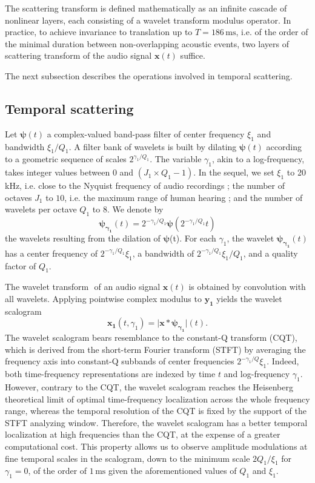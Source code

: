 \documentclass[journal]{IEEEtran}
\makeatletter
\newcommand*{\ie}{i.e.\@\xspace}
\makeatother
\begin{document}
The scattering transform is defined mathematically as an infinite cascade of nonlinear layers, each consisting of a wavelet transform modulus operator.
In practice, to achieve invariance to translation up to $T = 186\,\mathrm{ms}$, \ie of the order of the minimal duration between non-overlapping acoustic events, two layers of scattering transform of the audio signal $\boldsymbol{x}(t)$ suffice.

The next subsection describes the operations involved in temporal scattering.

\subsection{Temporal scattering}
Let $\boldsymbol{\psi}(t)$ a complex-valued band-pass filter of
center frequency $\xi_1$ and bandwidth $\xi_1/Q_1$.
A filter bank of wavelets is built by dilating $\boldsymbol{\psi}(t)$
according to a geometric sequence of scales $2^{\gamma_1/Q_1}$.
The variable $\gamma_1$, akin to a log-frequency, takes integer values between $0$ and $(J_1 \times Q_1 - 1)$.
In the sequel, we set $\xi_1$ to 20 kHz, \ie close to the Nyquist frequency of audio recordings ; the number of octaves $J_1$ to $10$, \ie the maximum range of human hearing ; and the number of wavelets per octave $Q_1$ to $8$.
We denote by
\begin{equation}
\boldsymbol{\psi_{\gamma_1}}(t) = 2^{-\gamma_1/Q_1} \boldsymbol{\psi}(2^{-\gamma_1/Q_1} t)
\end{equation}
the wavelets resulting from the dilation of $\boldsymbol{\psi}$(t).
For each $\gamma_1$, the wavelet $\boldsymbol{\psi_{\gamma_1}}(t)$
has a center frequency of $2^{-\gamma_1/Q_1}\xi_1$, a bandwidth of $2^{-\gamma_1/Q_1}\xi_1/Q_1$, and a quality factor of $Q_1$.

The wavelet transform $\boldsymbol{}$ of an audio signal
$\boldsymbol{x}(t)$ is obtained by convolution with all wavelets.
Applying pointwise complex modulus to $\boldsymbol{y_1}$ yields
the wavelet scalogram
\begin{equation}
\boldsymbol{x_1}(t, \gamma_1)
= \vert \boldsymbol{x} \ast \boldsymbol{\psi_{\gamma_1}} \vert (t).
\end{equation}
The wavelet scalogram bears resemblance to the constant-Q transform (CQT),
which is derived from the short-term Fourier transform (STFT) by averaging the frequency
axis into constant-Q subbands of center frequencies $2^{-\gamma_1/Q}\xi_1$.
Indeed, both time-frequency representations are indexed by time $t$ and log-frequency $\gamma_1$.
However, contrary to the CQT, the wavelet scalogram reaches the Heisenberg
theoretical limit of optimal time-frequency localization across the whole
frequency range, whereas the temporal resolution of the CQT is fixed by the support of the STFT analyzing window.
Therefore, the wavelet scalogram has a better temporal localization at high
frequencies than the CQT, at the expense of a greater computational cost.
This property allows us to observe amplitude modulations at fine temporal scales in the scalogram, down to the minimum scale $2Q_1/\xi_1$ for $\gamma_1 = 0$, of the order of $1\,\textrm{ms}$ given the aforementioned values of $Q_1$ and $\xi_1$.
\end{document}
